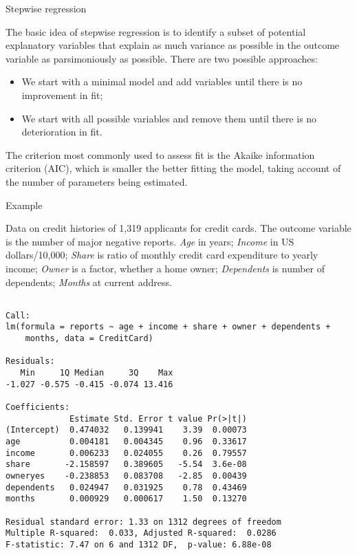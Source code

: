 \documentclass[10pt,ignorenonframetext,]{beamer}
\providecommand{\tightlist}{%
  \setlength{\itemsep}{0pt}\setlength{\parskip}{0pt}}
\begin{document}
\begin{frame}{Stepwise regression}

The basic idea of stepwise regression is to identify a subset of
potential explanatory variables that explain as much variance as
possible in the outcome variable as parsimoniously as possible. There
are two possible approaches:

\begin{itemize}
\tightlist
\item
  We start with a minimal model and add variables until there is no
  improvement in fit;
\item
  We start with all possible variables and remove them until there is no
  deterioration in fit.
\end{itemize}

The criterion most commonly used to assess fit is the Akaike information
criterion (AIC), which is smaller the better fitting the model, taking
account of the number of parameters being estimated.

\end{frame}

\begin{frame}[fragile]{Example}

Data on credit histories of 1,319 applicants for credit cards. The
outcome variable is the number of major negative reports. \emph{Age} in
years; \emph{Income} in US dollars/10,000; \emph{Share} is ratio of
monthly credit card expenditure to yearly income; \emph{Owner} is a
factor, whether a home owner; \emph{Dependents} is number of dependents;
\emph{Months} at current address.

\tiny

\begin{verbatim}

Call:
lm(formula = reports ~ age + income + share + owner + dependents + 
    months, data = CreditCard)

Residuals:
   Min     1Q Median     3Q    Max 
-1.027 -0.575 -0.415 -0.074 13.416 

Coefficients:
             Estimate Std. Error t value Pr(>|t|)
(Intercept)  0.474032   0.139941    3.39  0.00073
age          0.004181   0.004345    0.96  0.33617
income       0.006233   0.024055    0.26  0.79557
share       -2.158597   0.389605   -5.54  3.6e-08
owneryes    -0.238853   0.083708   -2.85  0.00439
dependents   0.024947   0.031925    0.78  0.43469
months       0.000929   0.000617    1.50  0.13270

Residual standard error: 1.33 on 1312 degrees of freedom
Multiple R-squared:  0.033, Adjusted R-squared:  0.0286 
F-statistic: 7.47 on 6 and 1312 DF,  p-value: 6.88e-08
\end{verbatim}

\end{frame}
\end{document}
